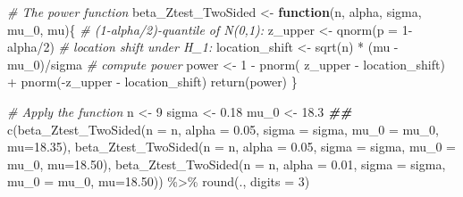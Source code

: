 \documentclass[
]{book}
\newenvironment{Shaded}{\begin{snugshade}}{\end{snugshade}}
\newcommand{\AttributeTok}[1]{\textcolor[rgb]{0.77,0.63,0.00}{#1}}
\newcommand{\CommentTok}[1]{\textcolor[rgb]{0.56,0.35,0.01}{\textit{#1}}}
\newcommand{\ControlFlowTok}[1]{\textcolor[rgb]{0.13,0.29,0.53}{\textbf{#1}}}
\newcommand{\DecValTok}[1]{\textcolor[rgb]{0.00,0.00,0.81}{#1}}
\newcommand{\DocumentationTok}[1]{\textcolor[rgb]{0.56,0.35,0.01}{\textbf{\textit{#1}}}}
\newcommand{\FloatTok}[1]{\textcolor[rgb]{0.00,0.00,0.81}{#1}}
\newcommand{\FunctionTok}[1]{\textcolor[rgb]{0.00,0.00,0.00}{#1}}
\newcommand{\NormalTok}[1]{#1}
\newcommand{\OtherTok}[1]{\textcolor[rgb]{0.56,0.35,0.01}{#1}}
\newcommand{\SpecialCharTok}[1]{\textcolor[rgb]{0.00,0.00,0.00}{#1}}
\begin{document}
\begin{Shaded}
\begin{Highlighting}[]
\CommentTok{\# The power function}
\NormalTok{beta\_Ztest\_TwoSided }\OtherTok{\textless{}{-}} \ControlFlowTok{function}\NormalTok{(n, alpha, sigma, mu\_0, mu)\{}
  \CommentTok{\# (1{-}alpha/2){-}quantile of N(0,1):}
\NormalTok{  z\_upper        }\OtherTok{\textless{}{-}} \FunctionTok{qnorm}\NormalTok{(}\AttributeTok{p =} \DecValTok{1}\SpecialCharTok{{-}}\NormalTok{alpha}\SpecialCharTok{/}\DecValTok{2}\NormalTok{)}
  \CommentTok{\# location shift under H\_1:}
\NormalTok{  location\_shift }\OtherTok{\textless{}{-}} \FunctionTok{sqrt}\NormalTok{(n) }\SpecialCharTok{*}\NormalTok{ (mu }\SpecialCharTok{{-}}\NormalTok{ mu\_0)}\SpecialCharTok{/}\NormalTok{sigma}
  \CommentTok{\# compute power}
\NormalTok{  power          }\OtherTok{\textless{}{-}} \DecValTok{1} \SpecialCharTok{{-}} \FunctionTok{pnorm}\NormalTok{( z\_upper }\SpecialCharTok{{-}}\NormalTok{ location\_shift) }\SpecialCharTok{+} 
                        \FunctionTok{pnorm}\NormalTok{(}\SpecialCharTok{{-}}\NormalTok{z\_upper }\SpecialCharTok{{-}}\NormalTok{ location\_shift)}
  \FunctionTok{return}\NormalTok{(power)}
\NormalTok{\}}

\CommentTok{\# Apply the function}
\NormalTok{n     }\OtherTok{\textless{}{-}}  \DecValTok{9}
\NormalTok{sigma }\OtherTok{\textless{}{-}}  \FloatTok{0.18}
\NormalTok{mu\_0  }\OtherTok{\textless{}{-}} \FloatTok{18.3} 
\DocumentationTok{\#\#}
\FunctionTok{c}\NormalTok{(}\FunctionTok{beta\_Ztest\_TwoSided}\NormalTok{(}\AttributeTok{n =}\NormalTok{ n, }\AttributeTok{alpha =} \FloatTok{0.05}\NormalTok{, }\AttributeTok{sigma =}\NormalTok{ sigma, }\AttributeTok{mu\_0 =}\NormalTok{ mu\_0, }\AttributeTok{mu=}\FloatTok{18.35}\NormalTok{),}
  \FunctionTok{beta\_Ztest\_TwoSided}\NormalTok{(}\AttributeTok{n =}\NormalTok{ n, }\AttributeTok{alpha =} \FloatTok{0.05}\NormalTok{, }\AttributeTok{sigma =}\NormalTok{ sigma, }\AttributeTok{mu\_0 =}\NormalTok{ mu\_0, }\AttributeTok{mu=}\FloatTok{18.50}\NormalTok{),}
  \FunctionTok{beta\_Ztest\_TwoSided}\NormalTok{(}\AttributeTok{n =}\NormalTok{ n, }\AttributeTok{alpha =} \FloatTok{0.01}\NormalTok{, }\AttributeTok{sigma =}\NormalTok{ sigma, }\AttributeTok{mu\_0 =}\NormalTok{ mu\_0, }\AttributeTok{mu=}\FloatTok{18.50}\NormalTok{)) }\SpecialCharTok{\%\textgreater{}\%} 
  \FunctionTok{round}\NormalTok{(., }\AttributeTok{digits =} \DecValTok{3}\NormalTok{)}
\end{Highlighting}
\end{Shaded}
\end{document}
